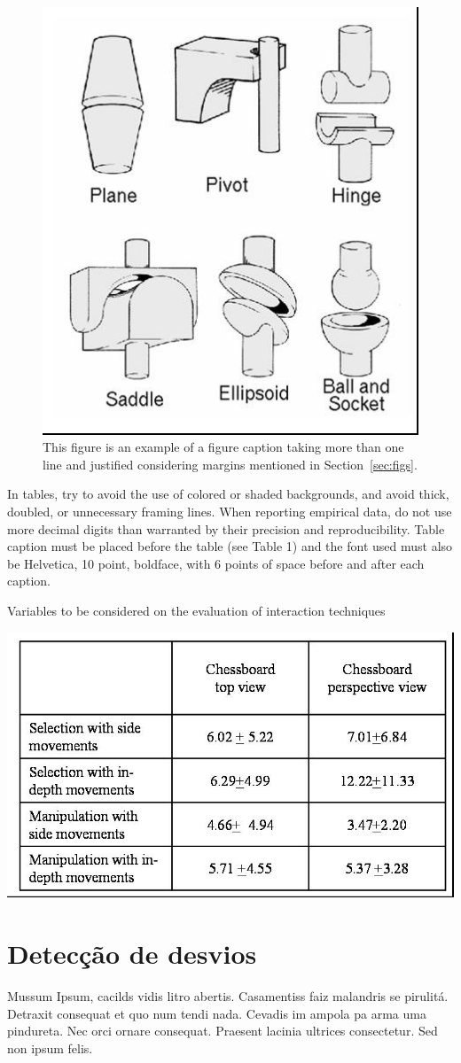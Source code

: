 \documentclass[12pt]{article}
\begin{document}
\begin{figure}[ht]
\centering
\includegraphics[width=.3\textwidth]{fig2.jpg}
\caption{This figure is an example of a figure caption taking more than one
  line and justified considering margins mentioned in Section~\ref{sec:figs}.}
\label{fig:exampleFig2}
\end{figure}

In tables, try to avoid the use of colored or shaded backgrounds, and avoid
thick, doubled, or unnecessary framing lines. When reporting empirical data,
do not use more decimal digits than warranted by their precision and
reproducibility. Table caption must be placed before the table (see Table 1)
and the font used must also be Helvetica, 10 point, boldface, with 6 points of
space before and after each caption.

\begin{table}[ht]
\centering
\caption{Variables to be considered on the evaluation of interaction
  techniques}
\label{tab:exTable1}
\includegraphics[width=.7\textwidth]{table.jpg}
\end{table}

\section{Detecção de desvios} \label{sec:DetecDesvios}

Mussum Ipsum, cacilds vidis litro abertis. Casamentiss faiz malandris se pirulitá. Detraxit consequat et quo num tendi nada. Cevadis im ampola pa arma uma pindureta. Nec orci ornare consequat. Praesent lacinia ultrices consectetur. Sed non ipsum felis.
\end{document}
